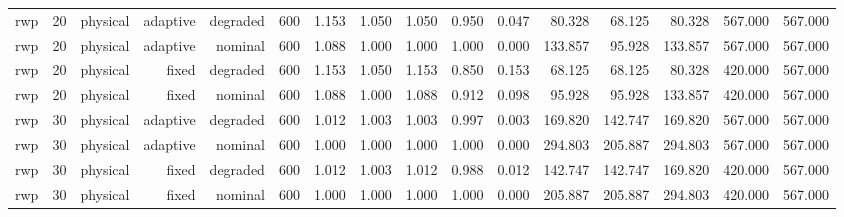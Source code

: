\begin{tabular}{lrrrrrrrrrrrrrrr}
rwp & 20 & physical & adaptive & degraded & 600 & 1.153 & 1.050 & 1.050 & 0.950 & 0.047 & 80.328 & 68.125 & 80.328 & 567.000 & 567.000 \\
rwp & 20 & physical & adaptive & nominal & 600 & 1.088 & 1.000 & 1.000 & 1.000 & 0.000 & 133.857 & 95.928 & 133.857 & 567.000 & 567.000 \\
rwp & 20 & physical & fixed & degraded & 600 & 1.153 & 1.050 & 1.153 & 0.850 & 0.153 & 68.125 & 68.125 & 80.328 & 420.000 & 567.000 \\
rwp & 20 & physical & fixed & nominal & 600 & 1.088 & 1.000 & 1.088 & 0.912 & 0.098 & 95.928 & 95.928 & 133.857 & 420.000 & 567.000 \\
rwp & 30 & physical & adaptive & degraded & 600 & 1.012 & 1.003 & 1.003 & 0.997 & 0.003 & 169.820 & 142.747 & 169.820 & 567.000 & 567.000 \\
rwp & 30 & physical & adaptive & nominal & 600 & 1.000 & 1.000 & 1.000 & 1.000 & 0.000 & 294.803 & 205.887 & 294.803 & 567.000 & 567.000 \\
rwp & 30 & physical & fixed & degraded & 600 & 1.012 & 1.003 & 1.012 & 0.988 & 0.012 & 142.747 & 142.747 & 169.820 & 420.000 & 567.000 \\
rwp & 30 & physical & fixed & nominal & 600 & 1.000 & 1.000 & 1.000 & 1.000 & 0.000 & 205.887 & 205.887 & 294.803 & 420.000 & 567.000 \\
\bottomrule
\end{tabular}